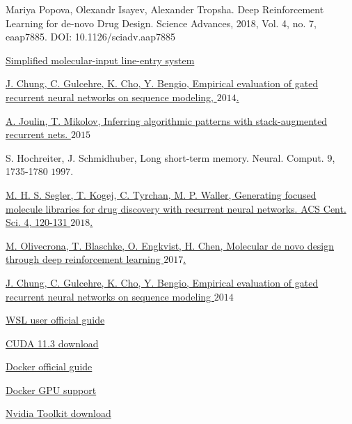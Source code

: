 \documentclass[a4paper]{article}
\begin{document}
\pagebreak
\begin{thebibliography}{1}

{Mariya Popova, Olexandr Isayev, Alexander Tropsha. Deep Reinforcement Learning for de-novo Drug Design. Science Advances, 2018, Vol. 4, no. 7, eaap7885. DOI: 10.1126/sciadv.aap7885}

\href{https://en.wikipedia.org/wiki/Simplified_molecular-input_line-entry_system/}{Simplified molecular-input line-entry system}

\href{http://arxiv.org/abs/1412.3555/}{J. Chung, C. Gulcehre, K. Cho, Y. Bengio, Empirical evaluation of gated recurrent neural networks on sequence modeling, \(2014\).}

\href{http://arxiv.org/abs/1503.01007}{A. Joulin, T. Mikolov, Inferring algorithmic patterns with stack-augmented recurrent nets. \(2015\)}

{S. Hochreiter, J. Schmidhuber, Long short-term memory. Neural. Comput. 9, 1735-1780 \(1997\).}

\href{https://pubs.acs.org/doi/10.1021/acscentsci.7b00512}{M. H. S. Segler, T. Kogej, C. Tyrchan, M. P. Waller, Generating focused molecule libraries for drug discovery with recurrent neural networks. ACS Cent. Sci. 4, 120-131 \(2018\).}

\href{http://arxiv.org/abs/1704.07555}{M. Olivecrona, T. Blaschke, O. Engkvist, H. Chen, Molecular de novo design through deep reinforcement learning \(2017\).}

\href{http://arxiv.org/abs/1412.3555}{J. Chung, C. Gulcehre, K. Cho, Y. Bengio, Empirical evaluation of gated recurrent neural networks on sequence modeling \(2014\)}

\href{https://docs.nvidia.com/cuda/wsl-user-guide/index.html#getting-started-with-cuda-on-wsl}{WSL user official guide}

\href{https://developer.nvidia.com/cuda-11.3.0-download-archive}{CUDA 11.3 download}

\href{https://www.docker.com}{Docker official guide} 

\href{https://docs.docker.com/compose/gpu-support/}{Docker GPU support}

\href{https://docs.nvidia.com/datacenter/cloud-native/container-toolkit/install-guide.html#install-guide}{Nvidia Toolkit download}


\end{thebibliography}
\end{document}
